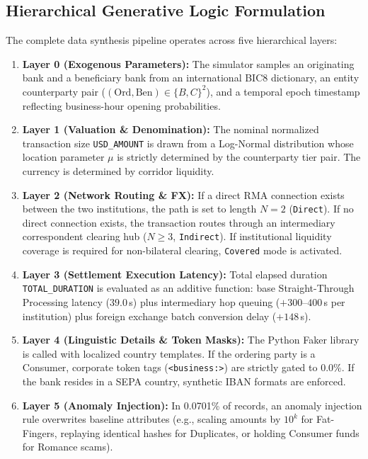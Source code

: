 \documentclass[11pt,a4paper]{article}
\begin{document}
\subsection{Hierarchical Generative Logic Formulation}
The complete data synthesis pipeline operates across five hierarchical layers:
\begin{enumerate}
    \item \textbf{Layer 0 (Exogenous Parameters):} The simulator samples an originating bank and a beneficiary bank from an international BIC8 dictionary, an entity counterparty pair ($(\text{Ord}, \text{Ben}) \in \{B, C\}^2$), and a temporal epoch timestamp reflecting business-hour opening probabilities.
    \item \textbf{Layer 1 (Valuation \& Denomination):} The nominal normalized transaction size \texttt{USD\_AMOUNT} is drawn from a Log-Normal distribution whose location parameter $\mu$ is strictly determined by the counterparty tier pair. The currency is determined by corridor liquidity.
    \item \textbf{Layer 2 (Network Routing \& FX):} If a direct RMA connection exists between the two institutions, the path is set to length $N=2$ (\texttt{Direct}). If no direct connection exists, the transaction routes through an intermediary correspondent clearing hub ($N \ge 3$, \texttt{Indirect}). If institutional liquidity coverage is required for non-bilateral clearing, \texttt{Covered} mode is activated.
    \item \textbf{Layer 3 (Settlement Execution Latency):} Total elapsed duration \texttt{TOTAL\_DURATION} is evaluated as an additive function: base Straight-Through Processing latency ($39.0$\,s) plus intermediary hop queuing ($+300\text{--}400$\,s per institution) plus foreign exchange batch conversion delay ($+148$\,s).
    \item \textbf{Layer 4 (Linguistic Details \& Token Masks):} The Python Faker library is called with localized country templates. If the ordering party is a Consumer, corporate token tags (\texttt{<business:>}) are strictly gated to $0.0\%$. If the bank resides in a SEPA country, synthetic IBAN formats are enforced.
    \item \textbf{Layer 5 (Anomaly Injection):} In 0.0701\% of records, an anomaly injection rule overwrites baseline attributes (e.g., scaling amounts by $10^k$ for Fat-Fingers, replaying identical hashes for Duplicates, or holding Consumer funds for Romance scams).
\end{enumerate}
\end{document}
